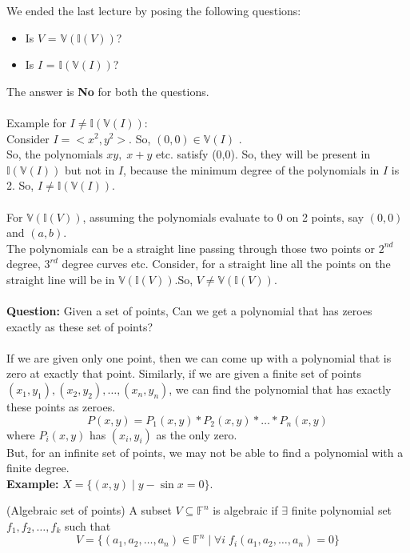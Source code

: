 We ended the last lecture by posing the following questions:
\begin{itemize}
\item Is $V$ = $\mathbb{V}(\mathbb{I}(V))$?
\item Is $I$ = $\mathbb{I}(\mathbb{V}(I))$?
\end{itemize}
The answer is \textbf{No} for both the questions.\\\\
Example for $I\neq\mathbb{I}(\mathbb{V}(I))$:\\
Consider $I = <x^2,y^2>$. So, $(0,0)\in\mathbb{V}(I)$ .\\
So, the polynomials $xy,\;x+y$ etc. satisfy (0,0). So, they will be present in $\mathbb{I}(\mathbb{V}(I))$ but not in $I$, because the minimum degree of the polynomials in $I$ is 2. So, $I\neq\mathbb{I}(\mathbb{V}(I))$.\\\\
For $\mathbb{V}(\mathbb{I}(V))$, assuming the polynomials evaluate to 0 on 2 points, say $(0,0)$ and $(a,b)$.\\
The polynomials can be a straight line passing through those two points or $2^{nd}$ degree, $3^{rd}$ degree curves etc. Consider, for a straight line all the points on the straight line will be in $\mathbb{V}(\mathbb{I}(V))$.So, $V \neq \mathbb{V}(\mathbb{I}(V))$.\\\\
\textbf{Question:} Given a set of points, Can we get a polynomial that has zeroes exactly as these set of points?\\\\
If we are given only one point, then we can come up with a polynomial that is zero at exactly that point. Similarly, if we are given a finite set of points $(x_1,y_1), (x_2,y_2), \ldots,(x_n,y_n)$, we can find the polynomial that has exactly these points as zeroes.
$$P(x,y) = P_1(x,y)*P_2(x,y)*\ldots*P_n(x,y)$$
where $P_i(x,y)$ has $(x_i,y_i)$ as the only zero.\\
But, for an infinite set of points, we may not be able to find a polynomial with a finite degree.\\
\textbf{Example:} $X=\{(x,y)\;|\;y - \sin x=0\}$.\\
\begin{definition}(Algebraic set of points)
A subset $V \subseteq \mathbb{F}^n$ is algebraic if 
$\exists$ finite polynomial set $f_1,f_2,\ldots,f_k$ such that 
$$
	V = \{(a_1, a_2, \ldots, a_n) \in \mathbb{F}^n \;|\; \forall i\; f_i(a_1, a_2, \ldots, a_n) = 0\}
$$
\end{definition}
